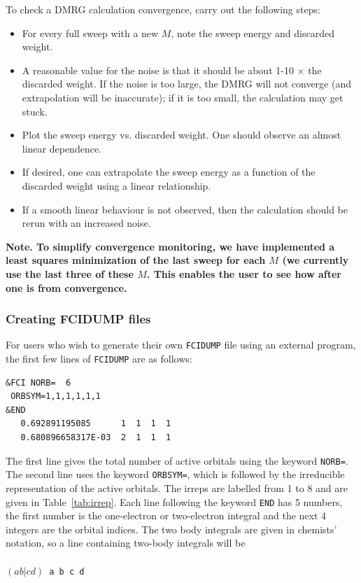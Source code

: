 \documentclass[letterpaper,12pt,aps, pra]{revtex4-1}
\begin{document}
To check a DMRG calculation convergence, carry out the following steps:
\begin{itemize}
\item For every full sweep with a new $M$, note the sweep energy and discarded weight.
\item A reasonable value for the noise is that it should be about 1-10 $\times$ the discarded weight. If the noise
is too large, the DMRG will not converge (and extrapolation will be inaccurate); if it is too small, the calculation
may get stuck.
\item Plot the sweep energy vs. discarded weight. One should observe an almost linear dependence. 
\item If desired, one can extrapolate the sweep energy as a function of the discarded weight using a 
linear relationship. 
\item If a smooth linear behaviour is not observed, then the calculation should be rerun with an increased noise.
\end{itemize}

{\bf Note.  To simplify convergence monitoring, we have implemented a least
squares minimization of the last sweep for each $M$ (we currently use the last
three of these $M$. This enables the user to see how after one is from
convergence.}

\subsubsection{Creating FCIDUMP files}\label{sec:appFCIDUMP}
For users who wish to generate their own \texttt{FCIDUMP} file using an external program, the first few lines of \texttt{FCIDUMP} are as follows:
\begin{verbatim}
&FCI NORB=  6
 ORBSYM=1,1,1,1,1,1
&END
   0.692891195085      1  1  1  1
   0.680896658317E-03  2  1  1  1
\end{verbatim}
The first line gives the total number of active orbitals using the keyword \texttt{NORB=}. The second line uses the keyword \texttt{ORBSYM=}, which is followed by the irreducible representation of the active orbitals. The irreps are labelled from 1 to 8 and are given in Table~\ref{tab:irrep}.
Each line following the keyword \texttt{END} has 5 numbers, the first number is the one-electron or two-electron integral and the next 4 integers are the orbital indices. The two body integrals are given in chemists' notation, so a line containing two-body integrals will be\\
\texttt{
\\$( a b|cd)$ a b c d\\}
 
\end{document}
